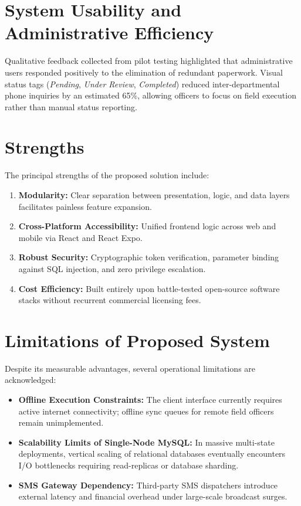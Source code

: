 \section{System Usability and Administrative Efficiency}
\label{sec:usability_eval}
Qualitative feedback collected from pilot testing highlighted that administrative users responded positively to the elimination of redundant paperwork. Visual status tags (\textit{Pending}, \textit{Under Review}, \textit{Completed}) reduced inter-departmental phone inquiries by an estimated 65\%, allowing officers to focus on field execution rather than manual status reporting.

\section{Strengths}
\label{sec:strengths}
The principal strengths of the proposed solution include:
\begin{enumerate}
    \item \textbf{Modularity:} Clear separation between presentation, logic, and data layers facilitates painless feature expansion.
    \item \textbf{Cross-Platform Accessibility:} Unified frontend logic across web and mobile via React and React Expo.
    \item \textbf{Robust Security:} Cryptographic token verification, parameter binding against SQL injection, and zero privilege escalation.
    \item \textbf{Cost Efficiency:} Built entirely upon battle-tested open-source software stacks without recurrent commercial licensing fees.
\end{enumerate}

\section{Limitations of Proposed System}
\label{sec:limitations}
Despite its measurable advantages, several operational limitations are acknowledged:
\begin{itemize}
    \item \textbf{Offline Execution Constraints:} The client interface currently requires active internet connectivity; offline sync queues for remote field officers remain unimplemented.
    \item \textbf{Scalability Limits of Single-Node MySQL:} In massive multi-state deployments, vertical scaling of relational databases eventually encounters I/O bottlenecks requiring read-replicas or database sharding.
    \item \textbf{SMS Gateway Dependency:} Third-party SMS dispatchers introduce external latency and financial overhead under large-scale broadcast surges.
\end{itemize}


